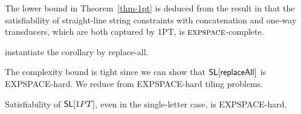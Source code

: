 The lower bound in Theorem~\ref{thm-1pt} is deduced from the result in \cite{LB16} that the satisfiability of straight-line string constraints with concatenation and one-way transducers, which are both captured by 1PT, is $\textsc{expspace}$-complete.


\begin{remark}
	instantiate the corollary by replace-all. 
\end{remark}

The complexity bound is tight since we can show that $\mathsf{SL}[\mathsf{replaceAll}]$ is EXPSPACE-hard. We reduce from EXPSPACE-hard tiling problems.  

%


\begin{theorem}\label{thm-1pt}
	Satisfiability of $\mathsf{SL}[1PT]$, even in the single-letter case, is EXPSPACE-hard.
\end{theorem}


%
%
